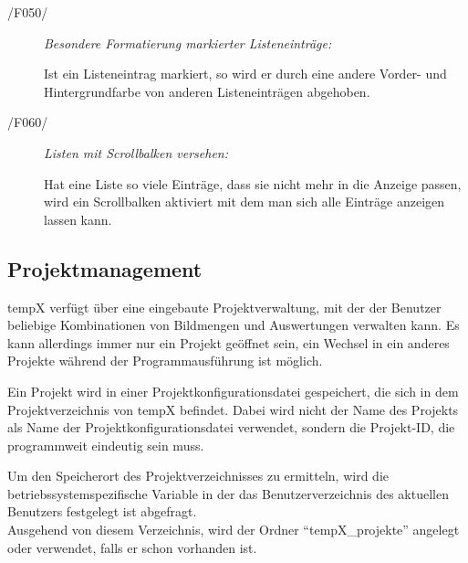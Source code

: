 \begin{description}
		\item[/F050/] \textit{Besondere Formatierung markierter Listeneinträge:}\par Ist ein Listeneintrag markiert, so wird er durch eine andere Vorder- und Hintergrundfarbe von anderen Listeneinträgen abgehoben.

		\item[/F060/] \textit{Listen mit Scrollbalken versehen:}\par Hat eine Liste so viele Einträge, dass sie nicht mehr in die Anzeige passen, wird ein Scrollbalken aktiviert mit dem man sich alle Einträge anzeigen lassen kann.
		
	\end{description}

\subsection{Projektmanagement}

\label{subsec:projektmanagement}
	
	\gls{tempX} verfügt über eine eingebaute Projektverwaltung, mit der der Benutzer beliebige Kombinationen von Bildmengen und Auswertungen verwalten kann. Es kann allerdings immer nur ein Projekt geöffnet sein, ein Wechsel in ein anderes Projekte während der Programmausführung ist möglich.\par Ein Projekt wird in einer Projektkonfigurationsdatei gespeichert, die sich in dem Projektverzeichnis von \gls{tempX} befindet. Dabei wird nicht der Name des Projekts als Name der Projektkonfigurationsdatei verwendet, sondern die Projekt-ID, die programmweit eindeutig sein muss.\par Um den Speicherort des Projektverzeichnisses zu ermitteln, wird die betriebssystemspezifische Variable in der das Benutzerverzeichnis des aktuellen Benutzers festgelegt ist abgefragt.\\ Ausgehend von diesem Verzeichnis, wird der Ordner "`\gls{tempX}\_projekte"' angelegt oder verwendet, falls er schon vorhanden ist.
	
